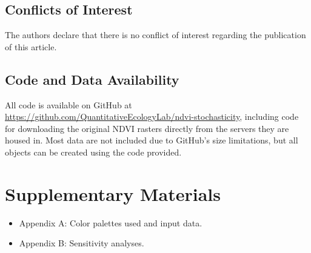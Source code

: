 \documentclass{article}
\begin{document}
\subsection*{Conflicts of Interest}

The authors declare that there is no conflict of interest regarding the publication of this article.

\subsection*{Code and Data Availability}

All code is available on GitHub at \href{https://github.com/QuantitativeEcologyLab/ndvi-stochasticity}{https://github.com/QuantitativeEcologyLab/ndvi-stochasticity}, including code for downloading the original NDVI rasters directly from the servers they are housed in. Most data are not included due to GitHub's size limitations, but all objects can be created using the code provided.

\section*{Supplementary Materials}

\begin{itemize}
\item Appendix A: Color palettes used and input data.
\item Appendix B: Sensitivity analyses.
\end{itemize}

\clearpage



\end{document}
